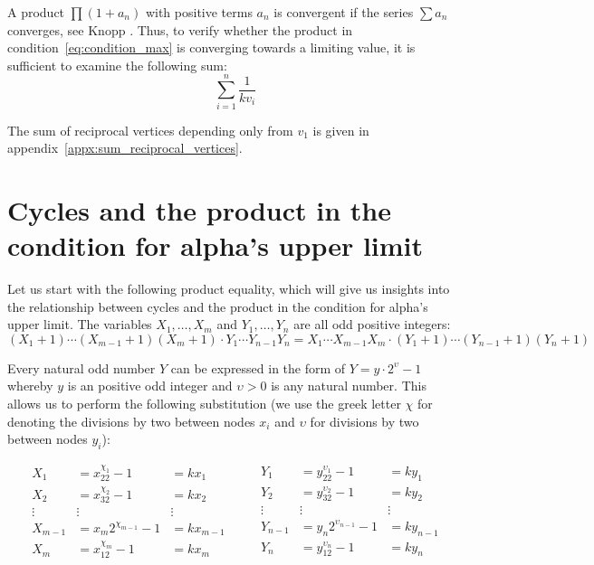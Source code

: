 A product $\prod(1+a_n)$ with positive terms $a_n$ is convergent if the series $\sum a_n$ converges, see Knopp \cite[p.~220]{Ref_Knopp}. Thus, to verify whether the product in condition~\ref{eq:condition_max} is converging towards a limiting value, it is sufficient to examine the following sum:
\begin{equation*}
\sum_{i=1}^{n}\frac{1}{kv_{i}}
\end{equation*}

The sum of reciprocal vertices depending only from $v_1$ is given in appendix~\ref{appx:sum_reciprocal_vertices}.

\section{Cycles and the product in the condition for alpha's upper limit}
Let us start with the following product equality, which will give us insights into the relationship between cycles and the product in the condition for alpha's upper limit. The variables $X_1,\ldots,X_m$ and $Y_1,\ldots,Y_n$ are all odd positive integers:
\begin{equation}
\label{eq:product_equality}
(X_1+1)\cdots(X_{m-1}+1)(X_m+1)\cdot Y_1\cdots Y_{n-1}Y_n=X_1\cdots X_{m-1}X_m\cdot(Y_1+1)\cdots(Y_{n-1}+1)(Y_n+1)
\end{equation}

Every natural odd number $Y$ can be expressed in the form of $Y=y\cdot2^{\upsilon}-1$ whereby $y$ is an positive odd integer and $\upsilon>0$ is any natural number. This allows us to perform the following substitution (we use the greek letter $\chi$ for denoting the divisions by two between nodes $x_i$ and $\upsilon$ for divisions by two between nodes $y_i$):

\[
\begin{array}{lll}
X_1&=x_22^{\chi_1}-1&=kx_1\\
X_2&=x_32^{\chi_2}-1&=kx_2\\
\vdots&\vdots&\vdots\\
X_{m-1}&=x_m2^{\chi_{m-1}}-1&=kx_{m-1}\\
X_m&=x_12^{\chi_m}-1&=kx_m
\end{array}\qquad
\begin{array}{lll}
Y_1&=y_22^{\upsilon_1}-1&=ky_1\\
Y_2&=y_32^{\upsilon_2}-1&=ky_2\\
\vdots&\vdots&\vdots\\
Y_{n-1}&=y_n2^{\upsilon_{n-1}}-1&=ky_{n-1}\\
Y_n&=y_12^{\upsilon_n}-1&=ky_n
\end{array}
\]

